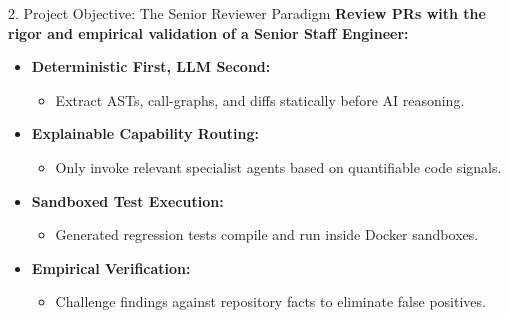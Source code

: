\documentclass[aspectratio=169,11pt]{beamer}
\begin{document}
\begin{frame}{2. Project Objective: The Senior Reviewer Paradigm}
  \textbf{Review PRs with the rigor and empirical validation of a Senior Staff Engineer:}
  \vspace{0.25cm}
  \begin{itemize}
    \item \textbf{Deterministic First, LLM Second:}
      \begin{itemize}
        \item Extract ASTs, call-graphs, and diffs statically before AI reasoning.
      \end{itemize}
    \vspace{0.2cm}
    \item \textbf{Explainable Capability Routing:}
      \begin{itemize}
        \item Only invoke relevant specialist agents based on quantifiable code signals.
      \end{itemize}
    \vspace{0.2cm}
    \item \textbf{Sandboxed Test Execution:}
      \begin{itemize}
        \item Generated regression tests compile and run inside Docker sandboxes.
      \end{itemize}
    \vspace{0.2cm}
    \item \textbf{Empirical Verification:}
      \begin{itemize}
        \item Challenge findings against repository facts to eliminate false positives.
      \end{itemize}
  \end{itemize}
\end{frame}
\end{document}
